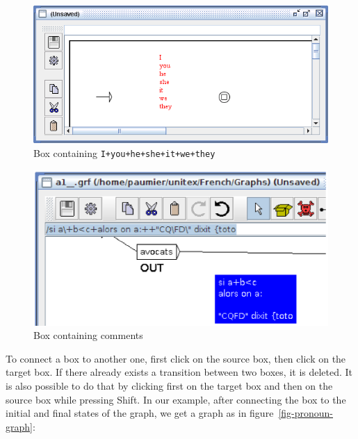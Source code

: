 \begin{figure}[!hb]
\begin{center}
\includegraphics[width=14.5cm]{resources/img/fig5-4.png}
\caption{Box containing
\texttt{I+you+he+she+it+we+they}\label{fig-pronoun-box}}
\end{center}
\end{figure}

\begin{figure}[!h]
\begin{center}
\includegraphics[width=12.5cm]{resources/img/fig5-4b.png}
\caption{Box containing comments\label{comment-box}}
\end{center}
\end{figure}

\bigskip
\noindent To connect a box to another one, first click on the source box, then
click on the target box. If there
already exists a transition between two boxes, it is deleted. It is also possible
to do that by clicking first on the target box and then on the
source box while pressing Shift. In our example, after connecting the box to the initial
and final states of the graph, we get a graph as in
figure~\ref{fig-pronoun-graph}:


